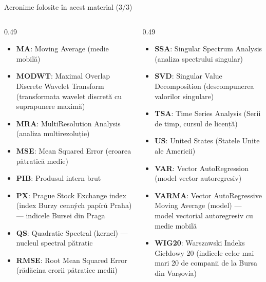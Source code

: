 \begin{frame}{Acronime folosite în acest material (3/3)}
\begin{columns}[T]
\begin{column}{0.49\textwidth}
\begin{itemize}\setlength{\itemsep}{0pt}
    \item \textbf{MA}: Moving Average (medie mobilă)
    \item \textbf{MODWT}: Maximal Overlap Discrete Wavelet Transform (transformata wavelet discretă cu suprapunere maximă)
    \item \textbf{MRA}: MultiResolution Analysis (analiza multirezoluție)
    \item \textbf{MSE}: Mean Squared Error (eroarea pătratică medie)
    \item \textbf{PIB}: Produsul intern brut
    \item \textbf{PX}: Prague Stock Exchange index (index Burzy cenných papírů Praha) — indicele Bursei din Praga
    \item \textbf{QS}: Quadratic Spectral (kernel) — nucleul spectral pătratic
    \item \textbf{RMSE}: Root Mean Squared Error (rădăcina erorii pătratice medii)
\end{itemize}
\end{column}
\begin{column}{0.49\textwidth}
\begin{itemize}\setlength{\itemsep}{0pt}
    \item \textbf{SSA}: Singular Spectrum Analysis (analiza spectrului singular)
    \item \textbf{SVD}: Singular Value Decomposition (descompunerea valorilor singulare)
    \item \textbf{TSA}: Time Series Analysis (Serii de timp, cursul de licență)
    \item \textbf{US}: United States (Statele Unite ale Americii)
    \item \textbf{VAR}: Vector AutoRegression (model vector autoregresiv)
    \item \textbf{VARMA}: Vector AutoRegressive Moving Average (model) — model vectorial autoregresiv cu medie mobilă
    \item \textbf{WIG20}: Warszawski Indeks Giełdowy 20 (indicele celor mai mari 20 de companii de la Bursa din Varșovia)
\end{itemize}
\end{column}
\end{columns}
\end{frame}

